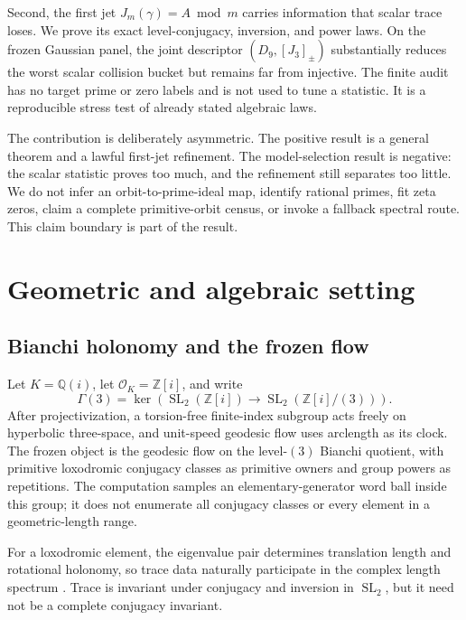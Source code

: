 \documentclass[11pt,a4paper]{article}
\theoremstyle{definition}
\theoremstyle{remark}
\newcommand{\SL}{\operatorname{SL}}
\newcommand{\Gauss}{\mathbb{Z}[i]}
\begin{document}
Second, the first jet \(J_m(\gamma)=A\bmod m\) carries information that scalar trace loses. We prove its exact level-conjugacy, inversion, and power laws. On the frozen Gaussian panel, the joint descriptor \((D_9,[J_3]_{\pm})\) substantially reduces the worst scalar collision bucket but remains far from injective. The finite audit has no target prime or zero labels and is not used to tune a statistic. It is a reproducible stress test of already stated algebraic laws.

The contribution is deliberately asymmetric. The positive result is a general theorem and a lawful first-jet refinement. The model-selection result is negative: the scalar statistic proves too much, and the refinement still separates too little. We do not infer an orbit-to-prime-ideal map, identify rational primes, fit zeta zeros, claim a complete primitive-orbit census, or invoke a fallback spectral route. This claim boundary is part of the result.

\section{Geometric and algebraic setting}

\subsection{Bianchi holonomy and the frozen flow}

Let \(K=\mathbb{Q}(i)\), let \(\mathcal O_K=\Gauss\), and write
\[
 \Gamma(3)=\ker\!\left(\SL_2(\Gauss)\longrightarrow\SL_2(\Gauss/(3))\right).
\]
After projectivization, a torsion-free finite-index subgroup acts freely on hyperbolic three-space, and unit-speed geodesic flow uses arclength as its clock. The frozen object is the geodesic flow on the level-\((3)\) Bianchi quotient, with primitive loxodromic conjugacy classes as primitive owners and group powers as repetitions. The computation samples an elementary-generator word ball inside this group; it does not enumerate all conjugacy classes or every element in a geometric-length range.

For a loxodromic element, the eigenvalue pair determines translation length and rotational holonomy, so trace data naturally participate in the complex length spectrum \citep[Introduction and Sec.~2]{LinLipnowski2022}. Trace is invariant under conjugacy and inversion in \(\SL_2\), but it need not be a complete conjugacy invariant.
\end{document}
